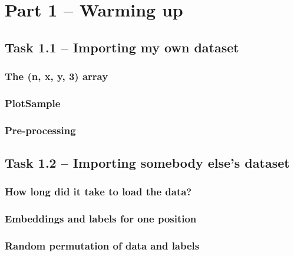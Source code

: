 \section{Part 1 -- Warming up}

\subsection{Task 1.1 -- Importing my own dataset}

\subsubsection*{The (n, x, y, 3) array}

\subsubsection*{PlotSample}

\subsubsection*{Pre-processing}

\subsection{Task 1.2 -- Importing somebody else's dataset}

\subsubsection*{How long did it take to load the data?}

\subsubsection*{Embeddings and labels for one position}

\subsubsection*{Random permutation of data and labels}
